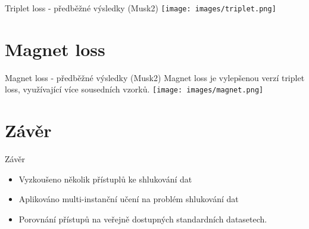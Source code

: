 \documentclass[10pt]{beamer}
\begin{document}
\begin{frame}{Triplet loss - předběžné výsledky (Musk2)}
	\centering
	\texttt{[image: images/triplet.png]}
\end{frame}

\section{Magnet loss}

\begin{frame}{Magnet loss - předběžné výsledky (Musk2)}
	Magnet loss je vylepšenou verzí triplet loss, využívající více sousedních vzorků.
	\centering
	\texttt{[image: images/magnet.png]}
\end{frame}

\section{Závěr}

\begin{frame}{Závěr}
	\begin{itemize}
		\item Vyzkoušeno několik přístuplů ke shlukování dat
		\item Aplikováno multi-instanční učení na problém shlukování dat
		\item Porovnání přístupů na veřejně dostupných standardních datasetech.
	\end{itemize}
\end{frame}
\end{document}

